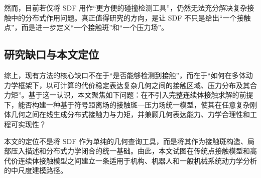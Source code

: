 然而，目前若仅将 SDF 用作“更方便的碰撞检测工具”，仍然无法充分解决复杂接触中的分布式作用问题。真正值得研究的方向，是让 SDF 不只是给出“一个接触点”，而是进一步定义“一个接触斑”和“一个压力场”。

\subsection{研究缺口与本文定位}
综上，现有方法的核心缺口不在于“是否能够检测到接触”，而在于“如何在多体动力学框架下，以可计算的代价稳定表达复杂几何之间的接触区域、压力分布及其合力矩”。基于这一认识，本文聚焦如下问题：在不引入完整连续体接触求解的前提下，能否构建一种基于符号距离场的接触斑—压力场统一模型，使其在任意复杂刚体几何之间在线生成分布式接触力与力矩，并兼顾几何表达能力、力学合理性和工程可实现性？

本文的定位不是将 SDF 作为单纯的几何查询工具，而是将其作为接触斑构造、局部压入描述和分布式力学闭合的统一基础。由此，本文试图在传统点接触模型和高代价连续体接触模型之间建立一条适用于机构、机器人和一般机械系统动力学分析的中尺度建模路径。
